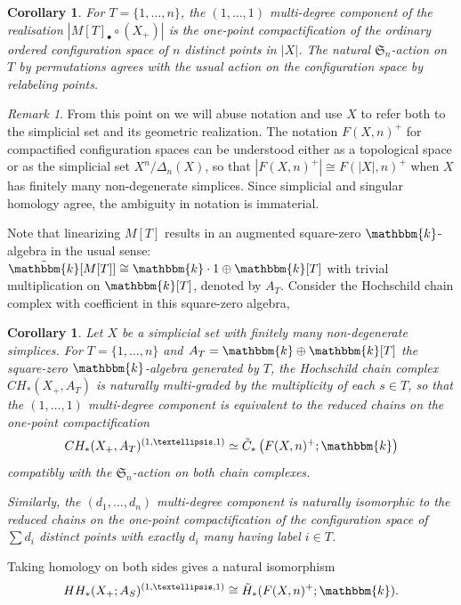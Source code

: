 \documentclass[12pt]{article}
\newcommand{\kk}{\mathbbm{k}}
\newcommand{\SymGroup}[1][n]{\mathfrak{S}_{#1}}
\theoremstyle{plain}
\newtheorem{cor}[thm]{Corollary}
\theoremstyle{definition}
\theoremstyle{remark}
\newtheorem{rmk}[thm]{Remark}
\begin{document}
\begin{cor}
For $T = \{1,\ldots,n\}$, the $(1,\ldots,1)$ multi-degree component of the realisation $|M[T]_{\bullet}\circ(X_+)|$ is the one-point compactification of the ordinary ordered configuration space of $n$ distinct points in $|X|$. The natural $\SymGroup[n]$-action on $T$ by permutations agrees with the usual action on the configuration space by relabeling points.
\end{cor}

\begin{rmk}
From this point on we will abuse notation and use $X$ to refer both to the simplicial set and its geometric realization. The notation $F(X,n)^+$ for compactified configuration spaces can be understood either as a topological space or as the simplicial set $X^n/\Delta_n(X)$, so that $|F(X,n)^+|\cong F(|X|,n)^+$ when $X$ has finitely many non-degenerate simplices. 
Since simplicial and singular homology agree, the ambiguity in notation is immaterial.
\end{rmk}

Note that linearizing $M[T]$ results in an augmented square-zero $\kk$-algebra in the usual sense: $\tilde{\kk}[M[T]] \cong \kk\cdot 1 \oplus \kk[T]$ with trivial multiplication on $\kk[T]$, denoted by $A_T$. Consider the Hochschild chain complex with coefficient in this square-zero algebra, 

\begin{cor}
Let $X$ be a simplicial set with finitely many non-degenerate simplices. For $T=\{1,\ldots,n\}$ and $A_T = \kk\oplus \kk[T]$ the square-zero $\kk$-algebra generated by $T$, the Hochschild chain complex $CH_\ast(X_+, A_T ) $ is naturally multi-graded by the multiplicity of each $s\in T$, so that the $(1,\ldots,1)$ multi-degree component is equivalent to the reduced chains on the one-point compactification
\begin{equation}\label{eq:chain level hochschild as configurations}
CH_*(X_+, A_T )^{(1,\ldots,1)} \simeq \tilde{C}_{*}\left( F(X,n)^+ ; \kk\right)
\end{equation}
compatibly with the $\SymGroup[n]$-action on both chain complexes.

Similarly, the $(d_1,\ldots,d_n)$ multi-degree component is naturally isomorphic to the reduced chains on the one-point compactification of the configuration space of $\sum d_i$ distinct points with exactly $d_i$ many having label $i\in T$.
\end{cor}

Taking homology on both sides gives a natural isomorphism
\begin{equation}\label{eq:iso-Hochschild-hom}
    HH_{\ast}(X_+; A_S)^{(1,\ldots,1)} \cong \tilde{H}_{\ast}(F(X, n)^+; \kk).
\end{equation}
\end{document}
